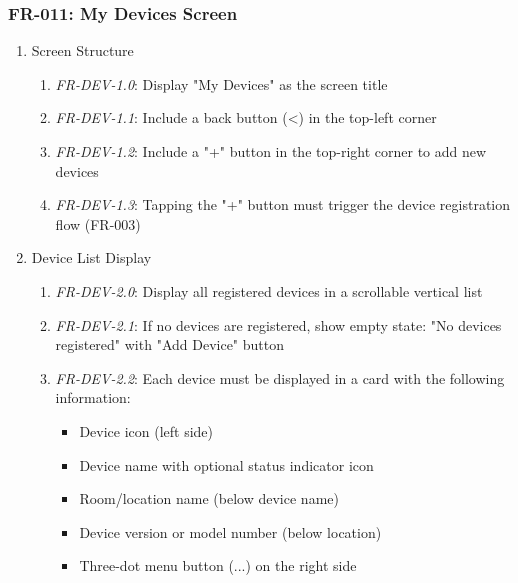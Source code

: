 \documentclass[conference]{IEEEtran}
\begin{document}
            \subsubsection{FR-011: My Devices Screen}
                \begin{enumerate}
                    \item Screen Structure
                        \begin{enumerate}
                            \item \textit{FR-DEV-1.0}: Display "My Devices" as the screen title
                            \item \textit{FR-DEV-1.1}: Include a back button (<) in the top-left corner
                            \item \textit{FR-DEV-1.2}: Include a "+" button in the top-right corner to add new devices
                            \item \textit{FR-DEV-1.3}: Tapping the "+" button must trigger the device registration flow (FR-003)
                        \end{enumerate}
                    \item Device List Display
                        \begin{enumerate}
                            \item \textit{FR-DEV-2.0}: Display all registered devices in a scrollable vertical list
                            \item \textit{FR-DEV-2.1}: If no devices are registered, show empty state: "No devices registered" with "Add Device" button
                            \item \textit{FR-DEV-2.2}: Each device must be displayed in a card with the following information:
                                \begin{itemize}
                                    \item Device icon (left side)
                                    \item Device name with optional status indicator icon
                                    \item Room/location name (below device name)
                                    \item Device version or model number (below location)
                                    \item Three-dot menu button (...) on the right side
                                \end{itemize}

\end{enumerate}
\end{enumerate}
\end{document}
